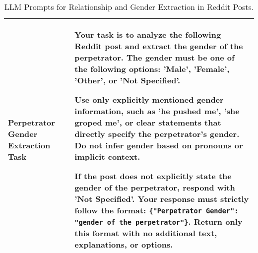 \documentclass[11pt]{article}
\begin{document}
\begin{table}[htb]
\begin{tabular}{|p{4cm}|p{12cm}|}
\textbf{Perpetrator Gender Extraction Task} & 
Your task is to analyze the following Reddit post and extract the gender of the perpetrator. The gender must be one of the following options: 'Male', 'Female', 'Other', or 'Not Specified'. 

Use only explicitly mentioned gender information, such as 'he pushed me', 'she groped me', or clear statements that directly specify the perpetrator's gender. Do not infer gender based on pronouns or implicit context. 

If the post does not explicitly state the gender of the perpetrator, respond with 'Not Specified'. Your response must strictly follow the format: \texttt{\{"Perpetrator Gender": "gender of the perpetrator"\}}. Return only this format with no additional text, explanations, or options. \\ \hline
\end{tabular}
\caption{LLM Prompts for Relationship and Gender Extraction in Reddit Posts.}
\label{tab:relationship_gender_prompts}
\end{table}

\clearpage 
\newpage
\end{document}
